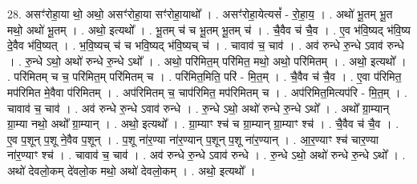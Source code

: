 \documentclass[17pt]{extarticle}
\begin{document}
28. असꣳ॑रोहा॒या थो॒ अथो॒ असꣳ॑रोहा॒या सꣳ॑रोहा॒याथो᳚ । . असꣳ॑रोहा॒येत्यसं᳚ - रो॒हा॒य॒ । . अथो॑ भू॒तम् भू॒त मथो॒ अथो॑ भू॒तम् । . अथो॒ इत्यथो᳚ । . भू॒तम् च॑ च भू॒तम् भू॒तम् च॑ । . चै॒वैव च॑ चै॒व । . ए॒व भ॑वि॒ष्यद् भ॑वि॒ष्य दे॒वैव भ॑वि॒ष्यत् । . भ॒वि॒ष्यच् च॑ च भवि॒ष्यद् भ॑वि॒ष्यच् च॑ । . चावाव॑ च॒ चाव॑ । . अव॑ रुन्धे रु॒न्धे ऽवाव॑ रुन्धे । . रु॒न्धे ऽथो॒ अथो॑ रुन्धे रु॒न्धे ऽथो᳚ । . अथो॒ परि॑मित॒म् परि॑मित॒ मथो॒ अथो॒ परि॑मितम् । . अथो॒ इत्यथो᳚ । . परि॑मितम् च च॒ परि॑मित॒म् परि॑मितम् च । . परि॑मित॒मिति॒ परि॑ - मि॒त॒म् । . चै॒वैव च॑ चै॒व । . ए॒वा प॑रिमित॒ मप॑रिमित मे॒वैवा प॑रिमितम् । . अप॑रिमितम् च॒ चाप॑रिमित॒ मप॑रिमितम् च । . अप॑रिमित॒मित्यप॑रि - मि॒त॒म् । . चावाव॑ च॒ चाव॑ । . अव॑ रुन्धे रु॒न्धे ऽवाव॑ रुन्धे । . रु॒न्धे ऽथो॒ अथो॑ रुन्धे रु॒न्धे ऽथो᳚ । . अथो᳚ ग्रा॒म्यान् ग्रा॒म्या नथो॒ अथो᳚ ग्रा॒म्यान् । . अथो॒ इत्यथो᳚ । . ग्रा॒म्याꣳ श्च॑ च ग्रा॒म्यान् ग्रा॒म्याꣳ श्च॑ । . चै॒वैव च॑ चै॒व । . ए॒व प॒शून् प॒शू ने॒वैव प॒शून् । . प॒शू ना॑र॒ण्या ना॑र॒ण्यान् प॒शून् प॒शू ना॑र॒ण्यान् । . आ॒र॒ण्याꣳ श्च॑ चार॒ण्या ना॑र॒ण्याꣳ श्च॑ । . चावाव॑ च॒ चाव॑ । . अव॑ रुन्धे रु॒न्धे ऽवाव॑ रुन्धे । . रु॒न्धे ऽथो॒ अथो॑ रुन्धे रु॒न्धे ऽथो᳚ । . अथो॑ देवलो॒कम् दे॑वलो॒क मथो॒ अथो॑ देवलो॒कम् । . अथो॒ इत्यथो᳚ । \newline
\end{document}
